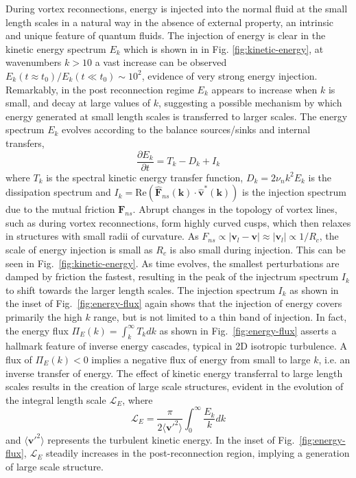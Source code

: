 \documentclass[%
 reprint,
 amsmath,amssymb,
 aps,
 prl,
]{revtex4-2}
\def \v{\mathbf{v}}
\def \k{\mathbf{k}}
\begin{document}
During vortex reconnections, energy is injected into the normal fluid at the small length scales in a natural way in the absence of external property, an intrinsic and unique feature of quantum fluids. The injection of energy is clear in the kinetic energy spectrum $E_k$ which is shown in in Fig. \ref{fig:kinetic-energy}, at wavenumbers $k>10$ a vast increase can be observed $E_k(t\approx t_0)/E_k(t\ll t_0)\sim10^2$, evidence of very strong energy injection. Remarkably, in the post reconnection regime $E_k$ appears to increase when $k$ is small, and decay at large values of $k$, suggesting a possible mechanism by which energy generated at small length scales is transferred to larger scales. The energy spectrum $E_k$ evolves according to the balance sources/sinks and internal transfers,
\begin{equation}
    \frac{\partial E_k}{\partial t} = T_k - D_k + I_k
\end{equation}
where $T_k$ is the spectral kinetic energy transfer function, $D_k=2\nu_n k^2 E_k$ is the dissipation spectrum and $I_k=\mathrm{Re}(\hat{\mathbf{F}}_{ns}(\k)\cdot\hat{\v}^*(\k))$ is the injection spectrum due to the mutual friction $\mathbf{F}_{ns}$. Abrupt changes in the topology of vortex lines, such as during vortex reconnections, form highly curved cusps, which then relaxes in structures with small radii of curvature. As $F_{ns}\propto|\v_l-\v|\approx|\v_l|\propto 1/R_c$, the scale of energy injection is small as $R_c$ is also small during injection. This can be seen in Fig.~\ref{fig:kinetic-energy}. As time evolves, the smallest perturbations are damped by friction the fastest, resulting in the peak of the injectrum spectrum $I_k$ to shift towards the larger length scales. 
The injection spectrum $I_k$ as shown in the inset of Fig.~\ref{fig:energy-flux} again shows that the injection of energy covers primarily the high $k$ range, but is not limited to a thin band of injection. In fact, the energy flux $\Pi_E(k) = \int_k^{\infty}T_k dk$ as shown in Fig.~\ref{fig:energy-flux} asserts a hallmark feature of inverse energy cascades, typical in 2D isotropic turbulence. A flux of $\Pi_E(k)<0$ implies a negative flux of energy from small to large $k$, i.e. an inverse transfer of energy. The effect of kinetic energy transferral to large length scales results in the creation of large scale structures, evident in the evolution of the integral length scale $\mathcal{L}_{E}$, where
\begin{equation}
    \mathcal{L}_E = \frac{\pi}{2\langle\mathbf{v}'^2\rangle}\int_0^{\infty}\frac{E_k}{k}dk
\end{equation}
and $\langle\mathbf{v}'^2\rangle$ represents the turbulent kinetic energy. In the inset of Fig.~\ref{fig:energy-flux}, $\mathcal{L}_E$ steadily increases in the post-reconnection region, implying a generation of large scale structure. 
\end{document}
